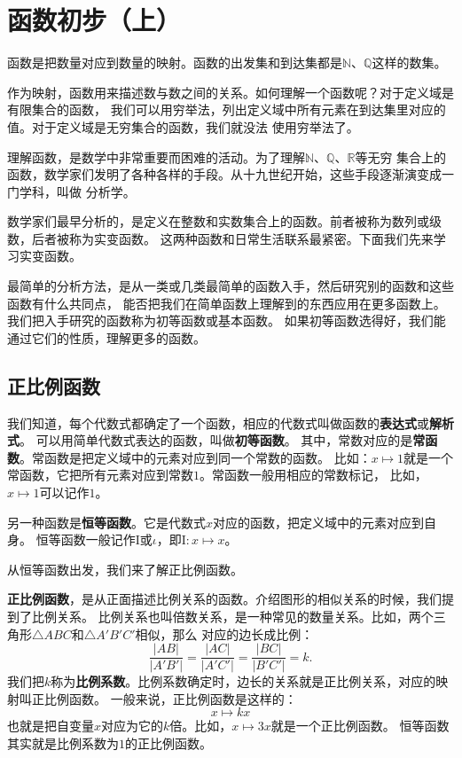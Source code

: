 \documentclass[12pt,UTF8,fontset=none]{ctexbook}
\begin{document}
\chapter{函数初步（上）}
函数是把数量对应到数量的映射。函数的出发集和到达集都是$\mathbb{N}$、$\mathbb{Q}$这样的数集。

作为映射，函数用来描述数与数之间的关系。如何理解一个函数呢？对于定义域是有限集合的函数，
我们可以用穷举法，列出定义域中所有元素在到达集里对应的值。对于定义域是无穷集合的函数，我们就没法
使用穷举法了。

理解函数，是数学中非常重要而困难的活动。为了理解$\mathbb{N}$、$\mathbb{Q}$、$\mathbb{R}$等无穷
集合上的函数，数学家们发明了各种各样的手段。从十九世纪开始，这些手段逐渐演变成一门学科，叫做
分析学。

数学家们最早分析的，是定义在整数和实数集合上的函数。前者被称为数列或级数，后者被称为实变函数。
这两种函数和日常生活联系最紧密。下面我们先来学习实变函数。

最简单的分析方法，是从一类或几类最简单的函数入手，然后研究别的函数和这些函数有什么共同点，
能否把我们在简单函数上理解到的东西应用在更多函数上。我们把入手研究的函数称为初等函数或基本函数。
如果初等函数选得好，我们能通过它们的性质，理解更多的函数。

\section{正比例函数}
我们知道，每个代数式都确定了一个函数，相应的代数式叫做函数的\textbf{表达式}或\textbf{解析式}。
可以用简单代数式表达的函数，叫做\textbf{初等函数}。
其中，常数对应的是\textbf{常函数}。常函数是把定义域中的元素对应到同一个常数的函数。
比如：$x\mapsto 1$就是一个常函数，它把所有元素对应到常数$1$。常函数一般用相应的常数标记，
比如，$x\mapsto 1$可以记作$1$。

另一种函数是\textbf{恒等函数}。它是代数式$x$对应的函数，把定义域中的元素对应到自身。
恒等函数一般记作$\mathrm{I}$或$\iota$，即$\mathrm{I}:x \mapsto x$。

从恒等函数出发，我们来了解正比例函数。

\textbf{正比例函数}，是从正面描述比例关系的函数。介绍图形的相似关系的时候，我们提到了比例关系。
比例关系也叫倍数关系，是一种常见的数量关系。比如，两个三角形$\triangle ABC$和$\triangle A'B'C'$相似，那么
对应的边长成比例：
$$ \frac{|AB|}{|A'B'|} = \frac{|AC|}{|A'C'|} = \frac{|BC|}{|B'C'|} = k.$$
我们把$k$称为\textbf{比例系数}。比例系数确定时，边长的关系就是正比例关系，对应的映射叫正比例函数。
一般来说，正比例函数是这样的：
$$ x \mapsto kx$$
也就是把自变量$x$对应为它的$k$倍。比如，$x \mapsto 3x$就是一个正比例函数。
恒等函数其实就是比例系数为$1$的正比例函数。
\end{document}
